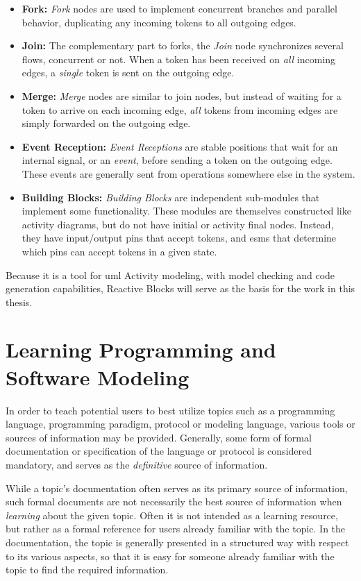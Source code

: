 \begin{itemize}
	\item{\textbf{Fork:}} \emph{Fork} nodes are used to implement concurrent branches and parallel behavior, duplicating any incoming tokens to all outgoing edges.
	\item{\textbf{Join:}} The complementary part to forks, the \emph{Join} node synchronizes several flows, concurrent or not. When a token has been received on \emph{all} incoming edges, a \emph{single} token is sent on the outgoing edge.
	\item{\textbf{Merge:}} \emph{Merge} nodes are similar to join nodes, but instead of waiting for a token to arrive on each incoming edge, \emph{all} tokens from incoming edges are simply forwarded on the outgoing edge.
	\item{\textbf{Event Reception:}} \emph{Event Receptions} are stable positions that wait for an internal signal, or an \emph{event}, before sending a token on the outgoing edge. These events are generally sent from operations somewhere else in the system.
	\item{\textbf{Building Blocks:}} \emph{Building Blocks} are independent sub-modules that implement some functionality. These modules are themselves constructed like activity diagrams, but do not have initial or activity final nodes. Instead, they have input/output pins that accept tokens, and \glspl{esm} that determine which pins can accept tokens in a given state. 
\end{itemize}

\noindent
Because it is a tool for \gls{uml} Activity modeling, with model checking and code generation capabilities, Reactive Blocks will serve as the basis for the work in this thesis.

\section{Learning Programming and Software Modeling}
\label{sec:learning_programming}
In order to teach potential users to best utilize topics such as a programming language, programming paradigm, protocol or modeling language, various tools or sources of information may be provided. Generally, some form of formal documentation or specification of the language or protocol is considered mandatory, and serves as the \emph{definitive} source of information.

\noindent
While a topic's documentation often serves as its primary source of information, such formal documents are not necessarily the best source of information when \emph{learning} about the given topic. Often it is not intended as a learning resource, but rather as a formal reference for users already familiar with the topic. In the documentation, the topic is generally presented in a structured way with respect to its various aspects, so that it is easy for someone already familiar with the topic to find the required information.

